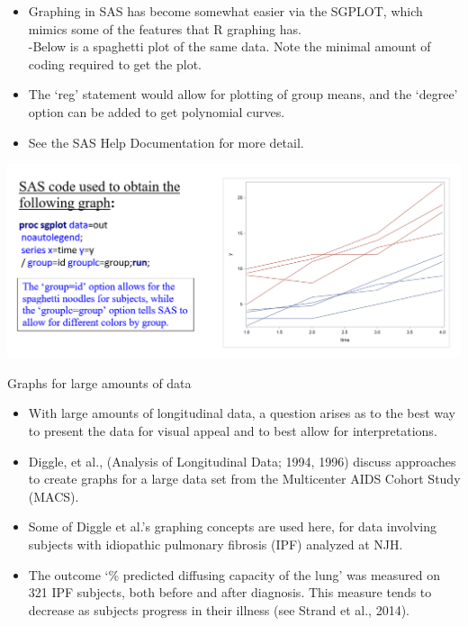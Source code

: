 \documentclass[
  9pt,
  ignorenonframetext,
]{beamer}
\providecommand{\tightlist}{%
  \setlength{\itemsep}{0pt}\setlength{\parskip}{0pt}}
\begin{document}
\begin{frame}{}
\protect\hypertarget{section-4}{}
\begin{itemize}
\tightlist
\item
  Graphing in SAS has become somewhat easier via the SGPLOT, which
  mimics some of the features that R graphing has.\\
  -Below is a spaghetti plot of the same data. Note the minimal amount
  of coding required to get the plot.\\
\item
  The `reg' statement would allow for plotting of group means, and the
  `degree' option can be added to get polynomial curves.\\
\item
  See the SAS Help Documentation for more detail.
\end{itemize}

\tiny

\begin{center}\includegraphics[width=1\linewidth]{figs_L2/L2-f3} \end{center}

\tiny
\end{frame}

\begin{frame}{Graphs for large amounts of data}
\protect\hypertarget{graphs-for-large-amounts-of-data}{}
\begin{itemize}
\item
  With large amounts of longitudinal data, a question arises as to the
  best way to present the data for visual appeal and to best allow for
  interpretations.
\item
  Diggle, et al., (Analysis of Longitudinal Data; 1994, 1996) discuss
  approaches to create graphs for a large data set from the Multicenter
  AIDS Cohort Study (MACS).
\item
  Some of Diggle et al.'s graphing concepts are used here, for data
  involving subjects with idiopathic pulmonary fibrosis (IPF) analyzed
  at NJH.
\item
  The outcome `\% predicted diffusing capacity of the lung' was measured
  on 321 IPF subjects, both before and after diagnosis. This measure
  tends to decrease as subjects progress in their illness (see Strand et
  al., 2014).
\end{itemize}
\end{frame}
\end{document}
